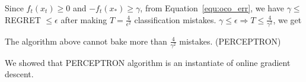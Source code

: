 \documentclass[11pt]{article}
\begin{document}
Since $f_t(x_t) \geq 0$ and $-f_t(x_*) \geq \gamma$, from Equation~\ref{equ:oco_err}, we have $\gamma \leq$ REGRET  $\leq \epsilon$ after making $T=\frac{4}{\epsilon^2}$ classification mistakes. $\gamma \leq \epsilon \Rightarrow T \leq \frac{4}{\gamma^2}$, we get
\begin{theorem}
    The algorithm above cannot bake more than $\frac{4}{\gamma^2}$ mistakes. (PERCEPTRON)
\end{theorem}
We showed that PERCEPTRON algorithm is an instantiate of online gradient descent.
\\
\end{document}
